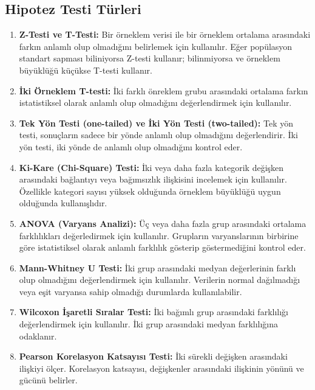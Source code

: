 \subsection{Hipotez Testi Türleri}
\begin{enumerate}
    \item \textbf{Z-Testi ve T-Testi:} Bir örneklem verisi ile bir örneklem ortalama arasındaki farkın anlamlı olup olmadığını belirlemek için kullanılır. Eğer popülasyon standart sapması biliniyorsa Z-testi kullanır; bilinmiyorsa ve örneklem büyüklüğü küçükse T-testi kullanır.
    \item \textbf{İki Örneklem T-testi:} İki farklı önreklem grubu arasındaki ortalama farkın istatistiksel olarak anlamlı olup olmadığını değerlendirmek için kullanılır.
    \item \textbf{Tek Yön Testi (one-tailed) ve İki Yön Testi (two-tailed):} Tek yön testi, sonuçların sadece bir yönde anlamlı olup olmadığını değerlendirir. İki yön testi, iki yönde de anlamlı olup olmadığını kontrol eder.
    \item \textbf{Ki-Kare (Chi-Square) Testi:} İki veya daha fazla kategorik değişken arasındaki bağlantıyı veya bağımsızlık ilişkisini incelemek için kullanılır. Özellikle kategori sayısı yüksek olduğunda örneklem büyüklüğü uygun olduğunda kullanışlıdır.
    \item \textbf{ANOVA (Varyans Analizi):} Üç veya daha fazla grup arasındaki ortalama farklılıkları değerledirmek için kullanılır. Grupların varyanslarının birbirine göre istatistiksel olarak anlamlı farklılık gösterip göstermediğini kontrol eder.
    \item \textbf{Mann-Whitney U Testi:} İki grup arasındaki medyan değerlerinin farklı olup olmadığını değerlendirmek için kullanılır. Verilerin normal dağılmadığı veya eşit varyansa sahip olmadığı durumlarda kullanılabilir.
    \item \textbf{Wilcoxon İşaretli Sıralar Testi:} İki bağımlı grup arasındaki farklılığı değerlendirmek için kullanılır. İki grup arasındaki medyan farklılığına odaklanır.
    \item \textbf{Pearson Korelasyon Katsayısı Testi:} İki sürekli değişken arasındaki ilişkiyi ölçer. Korelasyon katsayısı, değişkenler arasındaki ilişkinin yönünü ve gücünü belirler.
\end{enumerate}

